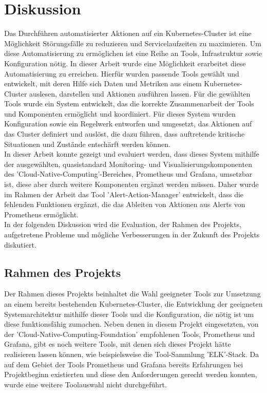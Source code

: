 \documentclass[a4paper,10pt]{scrartcl}
\begin{document}
\pagebreak

\section{Diskussion}

Das Durchführen automatisierter Aktionen auf ein Kubernetes-Cluster ist eine Möglichkeit Störungsfälle zu reduzieren und Servicelaufzeiten zu maximieren. Um diese Automatisierung zu ermöglichen ist eine Reihe an Tools, Infrastruktur sowie Konfiguration nötig. In dieser Arbeit wurde eine Möglichkeit erarbeitet diese Automatisierung zu erreichen. Hierfür wurden passende Tools gewählt und entwickelt, mit deren Hilfe sich Daten und Metriken aus einem Kubernetes-Cluster auslesen, darstellen und Aktionen ausführen lassen. Für die gewählten Tools wurde ein System entwickelt, das die korrekte Zusammenarbeit der Tools und Komponenten ermöglicht und koordiniert. Für dieses System wurden Konfiguration sowie ein Regelwerk entworfen und umgesetzt, das Aktionen auf das Cluster definiert und auslöst, die dazu führen, dass auftretende kritische Situationen und Zustände entschärft werden können.\\
In dieser Arbeit konnte gezeigt und evaluiert werden, dass dieses System mithilfe der ausgewählten, quasistandard Monitoring- und Visualisierungskomponenten des 'Cloud-Native-Computing'-Bereiches, Prometheus und Grafana, umsetzbar ist, diese aber durch weitere Komponenten ergänzt werden müssen. Daher wurde im Rahmen der Arbeit das Tool 'Alert-Action-Manager' entwickelt, dass die fehlenden Funktionen ergänzt, die das Ableiten von Aktionen aus Alerts von Prometheus ermöglicht. \\
In der folgenden Diskussion wird die Evaluation, der Rahmen des Projekts, aufgetretene Probleme und mögliche Verbesserungen in der Zukunft des Projekts diskutiert.

\subsection{Rahmen des Projekts}

Der Rahmen dieses Projekts beinhaltet die Wahl geeigneter Tools zur Umsetzung an einem bereits bestehenden Kubernetes-Cluster, die Entwicklung der geeigneten Systemarchitektur mithilfe dieser Tools und die Konfiguration, die nötig ist um diese funktionsfähig zumachen.
Neben denen in diesem Projekt eingesetzten, von der 'Cloud-Native-Computing-Foundation' empfohlenen Tools, Prometheus und Grafana, gibt es noch weitere Tools, mit denen sich dieses Projekt hätte realisieren lassen können, wie beispielsweise die Tool-Sammlung 'ELK'-Stack. Da auf dem Gebiet der Tools Prometheus und Grafana bereits Erfahrungen bei Projektbeginn existierten und diese den Anforderungen gerecht werden konnten, wurde eine weitere Toolauswahl nicht durchgeführt.
\end{document}
